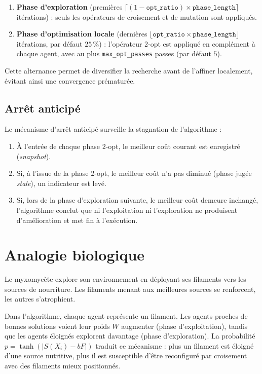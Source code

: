 \documentclass[12pt,a4paper]{report}
\begin{document}
\begin{enumerate}
	\item \textbf{Phase d'exploration}
	      (premières $\lceil(1 - \texttt{opt\_ratio}) \times \texttt{phase\_length}\rceil$
	      itérations) : seuls les opérateurs de croisement et de mutation sont
	      appliqués.
	\item \textbf{Phase d'optimisation locale}
	      (dernières $\lfloor\texttt{opt\_ratio} \times \texttt{phase\_length}\rfloor$
	      itérations, par défaut $25\,\%$) : l'opérateur 2-opt est
	      appliqué en complément à chaque agent, avec au plus
	      \texttt{max\_opt\_passes} passes (par défaut $5$).
\end{enumerate}

Cette alternance permet de diversifier la recherche avant de l'affiner
localement, évitant ainsi une convergence prématurée.

\section{Arrêt anticipé}
Le mécanisme d'arrêt anticipé surveille la stagnation de l'algorithme :
\begin{enumerate}
	\item À l'entrée de chaque phase 2-opt, le meilleur coût courant est
	      enregistré (\textit{snapshot}).
	\item Si, à l'issue de la phase 2-opt, le meilleur coût n'a pas diminué
	      (phase jugée \textit{stale}), un indicateur est levé.
	\item Si, lors de la phase d'exploration suivante, le meilleur coût
	      demeure inchangé, l'algorithme conclut que ni l'exploitation ni
	      l'exploration ne produisent d'amélioration et met fin à l'exécution.
\end{enumerate}

\chapter{Analogie biologique}
Le myxomycète explore son environnement en déployant ses filaments vers
les sources de nourriture. Les filaments menant aux meilleures sources
se renforcent, les autres s'atrophient.

Dans l'algorithme, chaque agent représente un filament. Les agents proches
de bonnes solutions voient leur poids $W$ augmenter (phase d'exploitation),
tandis que les agents éloignés explorent davantage (phase d'exploration).
La probabilité $p = \tanh(|S(X_i) - bF|)$ traduit ce mécanisme : plus un
filament est éloigné d'une source nutritive, plus il est susceptible d'être
reconfiguré par croisement avec des filaments mieux positionnés.
\end{document}
